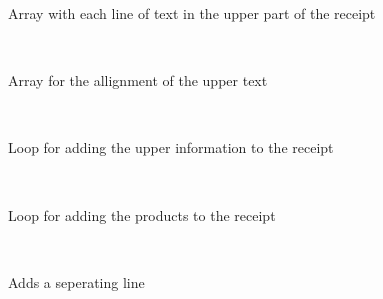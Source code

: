 Array with each line of text in the upper part of the receipt 

~\newline
~\newline
~\newline
~\newline
~\newline
~\newline
~\newline
~\newline
~\newline
~\newline
 

Array for the allignment of the upper text 

~\newline
~\newline
~\newline
~\newline
~\newline
~\newline
~\newline
~\newline
~\newline
 

Loop for adding the upper information to the receipt 

~\newline
~\newline
~\newline
~\newline
~\newline
~\newline
~\newline
~\newline
 

Loop for adding the products to the receipt 

~\newline
~\newline
~\newline
~\newline
~\newline
~\newline
~\newline
 

Adds a seperating line 

~\newline
~\newline
~\newline
~\newline
~\newline
~\newline
 

